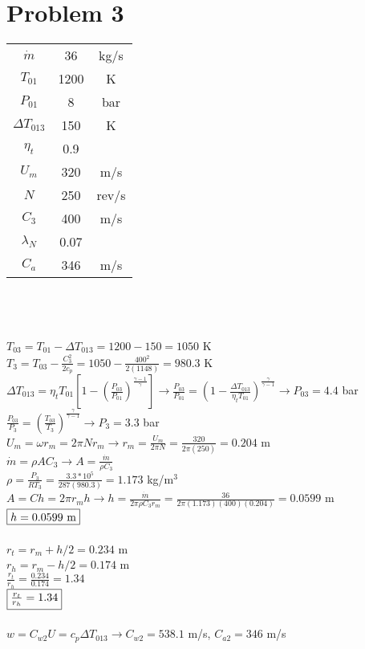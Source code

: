 \documentclass{article}
\begin{document}
\section*{Problem 3}
\begin{tabular}{ccc}
    $\dot{m}$ & 36 & kg/s \\
    $T_{01}$ & 1200 & K \\
    $P_{01}$ & 8 & bar \\
    $\Delta T_{013}$ & 150 & K \\
    $\eta_t$ & 0.9 \\
    $U_m$ & 320 & m/s \\
    $N$ & 250 & rev/s \\
    $C_3$ & 400 & m/s \\
    $\lambda_N$ & 0.07 \\
    $C_a$ & 346 & m/s
\end{tabular} \\\\\\
$T_{03}=T_{01}-\Delta T_{013}=1200-150=1050$ K \\
$T_3=T_{03}-\frac{C_3^2}{2c_p}=1050-\frac{400^2}{2(1148)}=980.3$ K \\
$\Delta T_{013}=\eta_t T_{01}[1-(\frac{P_{03}}{P_{01}})^\frac{\gamma-1}{\gamma}] \rightarrow
\frac{P_{03}}{P_{01}}=(1-\frac{\Delta T_{013}}{\eta_tT_{01}})^\frac{\gamma}{\gamma-1} \rightarrow
P_{03}=4.4$ bar \\
$\frac{P_{03}}{P_3}=(\frac{T_{03}}{T_3})^\frac{\gamma}{\gamma-1} \rightarrow P_3=3.3$ bar \\
$U_m=\omega r_m=2\pi Nr_m \rightarrow r_m=\frac{U_m}{2\pi N}=\frac{320}{2\pi(250)}=0.204$ m \\
$\dot{m}=\rho AC_3 \rightarrow A=\frac{\dot{m}}{\rho C_3}$ \\
$\rho=\frac{P_3}{RT_3}=\frac{3.3*10^5}{287(980.3)}=1.173$ kg/m$^3$ \\
$A=Ch=2\pi r_mh \rightarrow h=\frac{\dot{m}}{2\pi\rho C_3 r_m}=\frac{36}{2\pi(1.173)(400)(0.204)}
=0.0599$ m \\
$\fbox{$h=0.0599$ m}$ \\\\
$r_t=r_m + h/2=0.234$ m \\
$r_h=r_m - h/2=0.174$ m \\
$\frac{r_t}{r_h}=\frac{0.234}{0.174}=1.34$ \\
$\fbox{$\frac{r_t}{r_h}=1.34$}$ \\\\
$w=C_{w2}U=c_p\Delta T_{013} \rightarrow C_{w2}=538.1$ m/s, \quad $C_{a2}=346$ m/s \\
\end{document}
